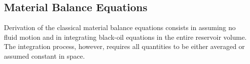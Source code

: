 \documentclass[authoryear,preprint,review,12pt]{elsarticle}
\begin{document}

%
%
%


\subsection{Material Balance Equations}

Derivation of the classical material balance equations consists in assuming no fluid motion and in integrating black-oil equations in the entire reservoir volume. The integration process, however, requires all quantities to be either averaged or assumed constant in space.

\end{document}

